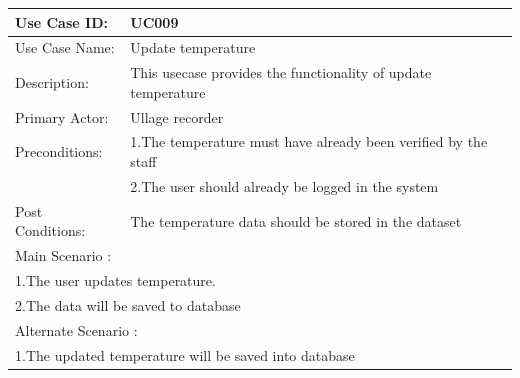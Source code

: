 	\begin{center}
	\vspace*{1\baselineskip}	
	\begin{tabular}{|l|p{10cm}|}
		\hline
		Use Case ID: & UC009 \\
		\hline
		Use Case Name: & Update temperature \\
		\hline
		Description: & This usecase provides the functionality of update temperature \\
		\hline
		Primary Actor: & Ullage recorder \\
		\hline
		Preconditions: & 1.The temperature must have already been verified by the staff\\ 
		& 2.The user should already be logged in the system \\
		\hline
		Post Conditions: & The temperature data should be stored in the dataset\\
		\hline
		\multicolumn{2}{|l|}{Main Scenario :} \\
		\hline
		\multicolumn{2}{|l|}{1.The user updates temperature.} \\
		\multicolumn{2}{|l|}{2.The data will be saved to database } \\
		\hline
		\multicolumn{2}{|l|}{Alternate Scenario :} \\
		\hline
		\multicolumn{2}{|l|}{1.The updated temperature will be saved into database} \\
		\hline
	\end{tabular}
	\end{center}
	
	
